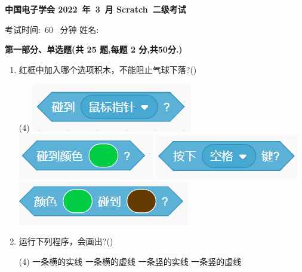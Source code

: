 \documentclass[10pt, a4paper]{article}
\newcommand{\Title}[3]{
    \begin{center}
        \Large \textbf{中国电子学会 #1~年~#2~月 Scratch~#3级考试}
    \end{center}
}
\newcommand{\TimeAndName}[1]{
    \begin{center}
        考试时间:~#1~ 分钟 \qquad\qquad\qquad\qquad 姓名:\underline{\quad\quad\quad\quad}
    \end{center}
}
\begin{document}
    \Title{2022}{3}{二} %
    \TimeAndName{60} %

    \vspace{2mm}
    {\noindent\textbf{第一部分、单选题(共 25 题,每题 2 分,共50分.)}}
    \begin{enumerate}
        \item 红框中加入哪个选项积木，不能阻止气球下落?(\qquad)
        \begin{tasks}(4)
            \task \includegraphics[width=.18\textwidth]{1a.png}
            \task \includegraphics[width=.15\textwidth]{1b.png}
            \task \includegraphics[width=.15\textwidth]{1c.png}
            \task \includegraphics[width=.18\textwidth]{1d.png}
        \end{tasks}

        \item 运行下列程序，会画出?(\qquad)
        \begin{tasks}(4)
            \task 一条横的实线
            \task 一条横的虚线
            \task 一条竖的实线
            \task 一条竖的虚线
        \end{tasks}


\end{enumerate}
\end{document}
